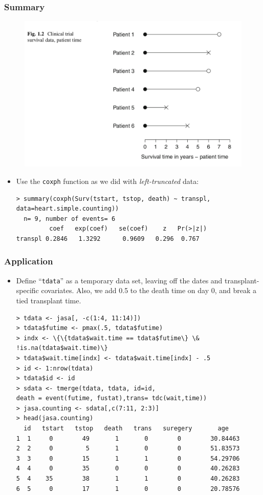 \documentclass{beamer}
\newcommand{\empr}[1]{{\emph{\color{red}#1}}}
\begin{document}
\pagebreak
\begin{frame}[fragile]
\frametitle{Summary}
\begin{figure}
\includegraphics[scale = .3]{002.png}
\end{figure}
\begin{itemize}
\item Use the \texttt{coxph} function as we did with \empr{left-truncated} data:
\begin{Verbatim}
> summary(coxph(Surv(tstart, tstop, death) ~ transpl, 
data=heart.simple.counting))
  n= 9, number of events= 6
         coef   exp(coef)   se(coef)    z   Pr(>|z|) 
transpl 0.2846   1.3292      0.9609   0.296  0.767
\end{Verbatim}
\end{itemize}
\end{frame}

\pagebreak
\begin{frame}[fragile]
\frametitle{Application}
\begin{itemize}
\item Define ``\texttt{tdata}'' as a temporary data set, leaving off the dates and transplant-specific covariates. Also, we add 0.5 to the death time on day 0, and break a tied transplant time.
\begin{Verbatim}
> tdata <- jasa[, -c(1:4, 11:14)]) 
> tdata$futime <- pmax(.5, tdata$futime)
> indx <- \{\{tdata$wait.time == tdata$futime\} \&
!is.na(tdata$wait.time)\}
> tdata$wait.time[indx] <- tdata$wait.time[indx] - .5
> id <- 1:nrow(tdata)
> tdata$id <- id
> sdata <- tmerge(tdata, tdata, id=id, 
death = event(futime, fustat),trans= tdc(wait,time))
> jasa.counting <- sdata[,c(7:11, 2:3)]
> head(jasa.counting)
  id   tstart   tstop   death   trans   suregery       age 
1  1     0        49       1       0        0        30.84463 
2  2     0         5       1       0        0        51.83573 
3  3     0        15       1       1        0        54.29706 
4  4     0        35       0       0        0        40.26283 
5  4    35        38       1       1        0        40.26283
6  5     0        17       1       0        0        20.78576 
\end{Verbatim}
\end{itemize}
\end{frame}
\end{document}
